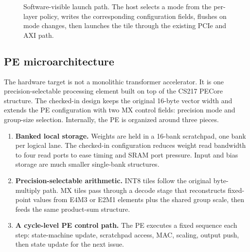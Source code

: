 \documentclass[11pt,a4paper]{article}
\begin{document}
\begin{figure}[t]
\centering
{}
\caption{Software-visible launch path. The host selects a mode from the per-layer policy, writes the corresponding configuration fields, flushes on mode changes, then launches the tile through the existing PCIe and AXI path.}
\label{fig:system-overview}
\end{figure}

\subsection{PE microarchitecture}

The hardware target is not a monolithic transformer accelerator. It is one precision-selectable processing element built on top of the CS217 PECore structure. The checked-in design keeps the original 16-byte vector width and extends the PE configuration with two MX control fields: precision mode and group-size selection. Internally, the PE is organized around three pieces.

\begin{enumerate}    \item \textbf{Banked local storage.} Weights are held in a 16-bank scratchpad, one bank per logical lane. The checked-in configuration reduces weight read bandwidth to four read ports to ease timing and SRAM port pressure. Input and bias storage are much smaller single-bank structures.
    \item \textbf{Precision-selectable arithmetic.} INT8 tiles follow the original byte-multiply path. MX tiles pass through a decode stage that reconstructs fixed-point values from E4M3 or E2M1 elements plus the shared group scale, then feeds the same product-sum structure.
    \item \textbf{A cycle-level PE control path.} The PE executes a fixed sequence each step: state-machine update, scratchpad access, MAC, scaling, output push, then state update for the next issue.
\end{enumerate}
\end{document}
